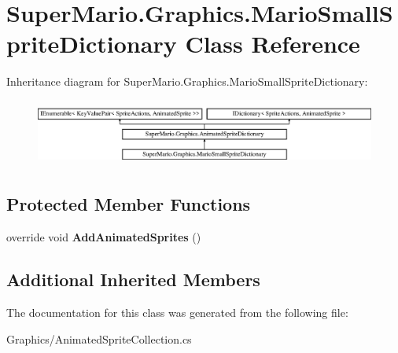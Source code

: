 \hypertarget{class_super_mario_1_1_graphics_1_1_mario_small_sprite_dictionary}{}\section{Super\+Mario.\+Graphics.\+Mario\+Small\+Sprite\+Dictionary Class Reference}
\label{class_super_mario_1_1_graphics_1_1_mario_small_sprite_dictionary}
Inheritance diagram for Super\+Mario.\+Graphics.\+Mario\+Small\+Sprite\+Dictionary\+:\begin{figure}[H]
\begin{center}
\leavevmode
\includegraphics[height=2.210526cm]{class_super_mario_1_1_graphics_1_1_mario_small_sprite_dictionary}
\end{center}
\end{figure}
\subsection*{Protected Member Functions}
\begin{DoxyCompactItemize}
\item 
\mbox{\label{class_super_mario_1_1_graphics_1_1_mario_small_sprite_dictionary_acc340d425eed2abfde2ef799866aa68d}} 
override void {\bfseries Add\+Animated\+Sprites} ()
\end{DoxyCompactItemize}
\subsection*{Additional Inherited Members}


The documentation for this class was generated from the following file\+:\begin{DoxyCompactItemize}
\item 
Graphics/Animated\+Sprite\+Collection.\+cs\end{DoxyCompactItemize}
